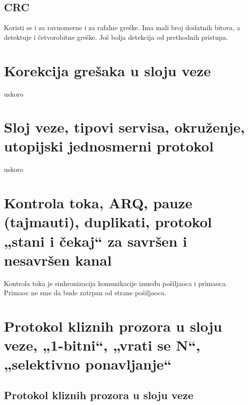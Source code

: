 \documentclass{article} %
\begin{document}
\subsection{CRC}
Koristi se i za ravnomerne i za rafalne greške. Ima mali broj dodatnih bitova, a detektuje i četvorobitne greške. Još bolja detekcija od prethodnih pristupa. 
\section{Korekcija grešaka u sloju veze}
uskoro
\section{Sloj veze, tipovi servisa, okruženje, utopijski jednosmerni protokol}
uskoro
\section{Kontrola toka, ARQ, pauze (tajmauti), duplikati, protokol „stani i čekaj“ za savršen i nesavršen kanal}
Kontrola toka je sinhronizacija komunikacije između pošiljaoca i primaoca. Primaoc ne sme da bude zatrpan od strane pošiljaoca.

\section{Protokol kliznih prozora u sloju veze, „1-bitni“, „vrati se N“, „selektivno ponavljanje“}

\subsection{Protokol kliznih prozora u sloju veze}
\end{document}
